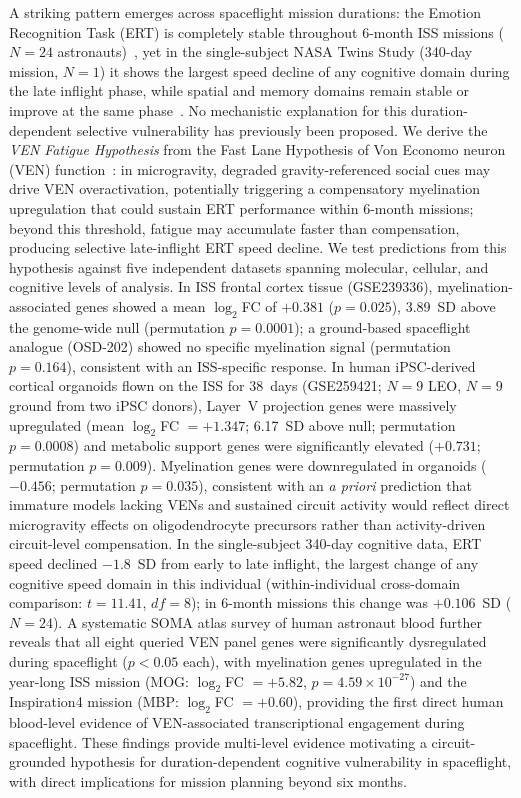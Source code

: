 \documentclass[11pt]{article}
\begin{document}
\par
\vspace{4pt}
{\small\noindent
A striking pattern emerges across spaceflight mission durations: the
Emotion Recognition Task (ERT) is completely stable throughout 6-month ISS
missions ($N=24$ astronauts)~\cite{dev2024}, yet in the single-subject
NASA Twins Study (340-day mission, $N=1$) it shows the largest speed
decline of any cognitive domain during the late inflight phase, while
spatial and memory domains remain stable or improve at the same
phase~\cite{garrett2019}.
No mechanistic explanation for this duration-dependent selective
vulnerability has previously been proposed.
We derive the \emph{VEN Fatigue Hypothesis} from the Fast Lane Hypothesis
of Von Economo neuron (VEN) function~\cite{keskin2026}: in microgravity,
degraded gravity-referenced social cues may drive VEN overactivation,
potentially triggering a compensatory myelination upregulation that could
sustain ERT performance within 6-month missions; beyond this threshold,
fatigue may accumulate faster than compensation, producing selective
late-inflight ERT speed decline.
We test predictions from this hypothesis against five independent datasets
spanning molecular, cellular, and cognitive levels of analysis.
In ISS frontal cortex tissue (GSE239336), myelination-associated genes
showed a mean $\log_2$FC of $+0.381$ ($p=0.025$), 3.89~SD above the
genome-wide null (permutation $p=0.0001$); a ground-based spaceflight
analogue (OSD-202) showed no specific myelination signal (permutation
$p=0.164$), consistent with an ISS-specific response.
In human iPSC-derived cortical organoids flown on the ISS for 38~days
(GSE259421; $N=9$ LEO, $N=9$ ground from two iPSC donors), Layer~V
projection genes were massively upregulated (mean $\log_2$FC $= +1.347$;
6.17~SD above null; permutation $p=0.0008$) and metabolic support genes
were significantly elevated ($+0.731$; permutation $p=0.009$).
Myelination genes were downregulated in organoids ($-0.456$; permutation
$p=0.035$), consistent with an \textit{a priori} prediction that immature
models lacking VENs and sustained circuit activity would reflect direct
microgravity effects on oligodendrocyte precursors rather than
activity-driven circuit-level compensation.
In the single-subject 340-day cognitive data, ERT speed declined
$-1.8$~SD from early to late inflight, the largest change of any cognitive
speed domain in this individual (within-individual cross-domain comparison:
$t=11.41$, $df=8$); in 6-month missions this change was $+0.106$~SD
($N=24$).
A systematic SOMA atlas survey of human astronaut blood further reveals
that all eight queried VEN panel genes were significantly dysregulated
during spaceflight ($p < 0.05$ each), with myelination genes upregulated
in the year-long ISS mission (MOG: $\log_2$FC $= +5.82$,
$p = 4.59 \times 10^{-27}$) and the Inspiration4 mission (MBP:
$\log_2$FC $= +0.60$), providing the first direct human blood-level
evidence of VEN-associated transcriptional engagement during spaceflight.
These findings provide multi-level evidence motivating a circuit-grounded
hypothesis for duration-dependent cognitive vulnerability in spaceflight,
with direct implications for mission planning beyond six months.
\par}
\end{document}
